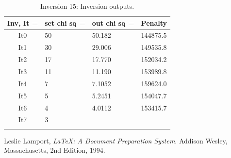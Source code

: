 \documentclass[fontsize=11pt, %
                             paper=a4, %
                             twoside, %
                             captions=tableheading,
                             index=totoc,
                             hyperref]{labbook}
\begin{document}
\begin{addmargin}[4cm]{0cm}
\begin{table}[!ht]
\label{tab:i15}
\raggedleft
\begin{tabular}{c l l l}
\toprule
\textbf{Inv, It = } & \textbf{set chi sq =} & \textbf{out chi sq =} & \textbf{Penalty} \\
\toprule
It0 & 50 & 50.182 & 144875.5\\
It1 & 30 & 29.006 & 149535.8\\
It2 & 17 & 17.770 & 152034.2\\
It3 & 11 & 11.190 & 153989.8\\
It4 & 7 & 7.1052 & 159624.0\\
It5 & 5 & 5.2451 & 154047.7\\
It6 & 4 & 4.0112 & 153415.7\\
It7 & 3 & & \\
\bottomrule\\
\end{tabular}
\caption{Inversion 15: Inversion outputs.}
\end{table}



 
\end{addmargin}


\begin{thebibliography}{9}

Leslie Lamport,
\emph{\LaTeX: A Document Preparation System}.
Addison Wesley, Massachusetts,
2nd Edition,
1994.

\end{thebibliography}

\end{document}
